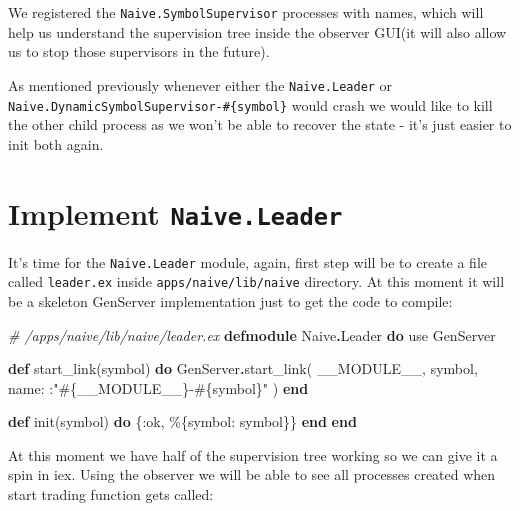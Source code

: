 \documentclass[
  oneside]{book}
\newenvironment{Shaded}{\begin{snugshade}}{\end{snugshade}}
\newcommand{\CommentTok}[1]{\textcolor[rgb]{0.56,0.35,0.01}{\textit{#1}}}
\newcommand{\ConstantTok}[1]{\textcolor[rgb]{0.00,0.00,0.00}{#1}}
\newcommand{\ImportTok}[1]{#1}
\newcommand{\KeywordTok}[1]{\textcolor[rgb]{0.13,0.29,0.53}{\textbf{#1}}}
\newcommand{\NormalTok}[1]{#1}
\newcommand{\OperatorTok}[1]{\textcolor[rgb]{0.81,0.36,0.00}{\textbf{#1}}}
\newcommand{\OtherTok}[1]{\textcolor[rgb]{0.56,0.35,0.01}{#1}}
\newcommand{\StringTok}[1]{\textcolor[rgb]{0.31,0.60,0.02}{#1}}
\newcommand{\VariableTok}[1]{\textcolor[rgb]{0.00,0.00,0.00}{#1}}
\begin{document}
We registered the \texttt{Naive.SymbolSupervisor} processes with names, which will help us understand the supervision tree inside the observer GUI(it will also allow us to stop those supervisors in the future).

As mentioned previously whenever either the \texttt{Naive.Leader} or \texttt{Naive.DynamicSymbolSupervisor-\#\{symbol\}} would crash we would like to kill the other child process as we won't be able to recover the state - it's just easier to init both again.

\hypertarget{implement-naive.leader}{%
\section{\texorpdfstring{Implement \texttt{Naive.Leader}}{Implement Naive.Leader}}\label{implement-naive.leader}}

It's time for the \texttt{Naive.Leader} module, again, first step will be to create a file called \texttt{leader.ex} inside \texttt{apps/naive/lib/naive} directory. At this moment it will be a skeleton GenServer implementation just to get the code to compile:

\begin{Shaded}
\begin{Highlighting}[]
\CommentTok{\# /apps/naive/lib/naive/leader.ex}
\KeywordTok{defmodule} \ConstantTok{Naive}\OperatorTok{.}\ConstantTok{Leader} \KeywordTok{do}
  \ImportTok{use} \ConstantTok{GenServer}

  \KeywordTok{def}\NormalTok{ start\_link(symbol) }\KeywordTok{do}
    \ConstantTok{GenServer}\OperatorTok{.}\NormalTok{start\_link(}
      \ConstantTok{\_\_MODULE\_\_}\NormalTok{,}
\NormalTok{      symbol,}
      \VariableTok{name:}\NormalTok{ :}\StringTok{"}\OtherTok{\#\{}\ConstantTok{\_\_MODULE\_\_}\OtherTok{\}}\StringTok{{-}}\OtherTok{\#\{}\NormalTok{symbol}\OtherTok{\}}\StringTok{"}
\NormalTok{    )}
  \KeywordTok{end}

  \KeywordTok{def}\NormalTok{ init(symbol) }\KeywordTok{do}
\NormalTok{    \{}\VariableTok{:ok}\NormalTok{, \%\{}\VariableTok{symbol:}\NormalTok{ symbol\}\}}
  \KeywordTok{end}
\KeywordTok{end}
\end{Highlighting}
\end{Shaded}

At this moment we have half of the supervision tree working so we can give it
a spin in iex. Using the observer we will be able to see all processes created when start trading function gets called:
\end{document}
